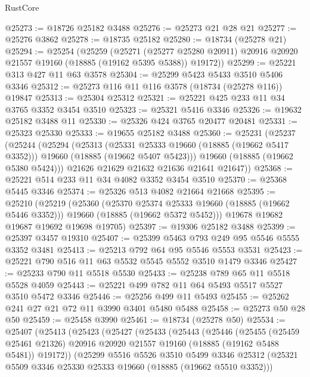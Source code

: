 \begin{lexlean}{RustCore}
\begin{coremodule}
@25273 := @18726 @25182 @3488
@25276 := @25273 @21 @28 @21
@25277 := @25276 @3862
@25278 := @18735 @25182
@25280 := @18734 (@25278 @21)
@25294 := @25254
    (@25259
      (@25271
        (@25277 @25280 @20911)
        @20916
        @20920
        @21557
        @19160
        (@18885 (@19162 @5395 @5388))
        @19172))
@25299 := @25221 @313 @427 @11 @63 @3578
@25304 := @25299 @5423 @5433 @3510 @5406 @3346
@25312 := @25273 @116 @11 @116 @3578 (@18734 (@25278 @116)) @19847
@25313 := @25304 @25312
@25321 := @25221 @425 @233 @11 @34 @3765 @3352 @3454 @3510
@25323 := @25321 @5416 @3346
@25326 := @19632 @25182 @3488 @11
@25330 := @25326 @424 @3765 @20477 @20481
@25331 := @25323 @25330
@25333 := @19655 @25182 @3488
@25360 := @25231
    (@25237
      (@25244
        (@25294
          (@25313
            (@25331 @25333 @19660 (@18885 (@19662 @5417 @3352)))
            @19660
            (@18885 (@19662 @5407 @5423)))
          @19660
          (@18885 (@19662 @5380 @5424)))
        @21626
        @21629
        @21632
        @21636
        @21641
        @21647))
@25368 := @25221 @514 @233 @11 @34 @4082 @3352 @3454 @3510
@25370 := @25368 @5445 @3346
@25374 := @25326 @513 @4082 @21664 @21668
@25395 := @25210
    (@25219
      (@25360
        (@25370 @25374 @25333 @19660 (@18885 (@19662 @5446 @3352)))
        @19660
        (@18885 (@19662 @5372 @5452)))
      @19678
      @19682
      @19687
      @19692
      @19698
      @19705)
@25397 := @19306 @25182 @3488
@25399 := @25397 @3457 @19310
@25407 := @25399 @5463 @793 @249 @95 @5546 @5555 @3352 @3481
@25413 := @25213 @792 @64 @95 @5546 @5553 @3531
@25423 := @25221 @790 @516 @11 @63 @5532 @5545 @5552 @3510 @1479 @3346
@25427 := @25233 @790 @11 @5518 @5530
@25433 := @25238 @789 @65 @11 @5518 @5528 @4059
@25443 := @25221 @499 @782 @11 @64 @5493 @5517 @5527 @3510 @5472 @3346
@25446 := @25256 @499 @11 @5493
@25455 := @25262 @241 @27 @21 @72 @11 @3990 @3401 @5480 @5488
@25458 := @25273 @50 @28 @50
@25459 := @25458 @3990
@25461 := @18734 (@25278 @50)
@25534 := @25407
    (@25413
      (@25423
        (@25427
          (@25433
            (@25443
              (@25446
                (@25455
                  (@25459 @25461 @21326)
                  @20916
                  @20920
                  @21557
                  @19160
                  (@18885 (@19162 @5488 @5481))
                  @19172))
              (@25299
                @5516
                @5526
                @3510
                @5499
                @3346
                @25312
                (@25321 @5509 @3346 @25330 @25333 @19660 (@18885 (@19662 @5510 @3352)))

\end{coremodule}
\end{lexlean}
